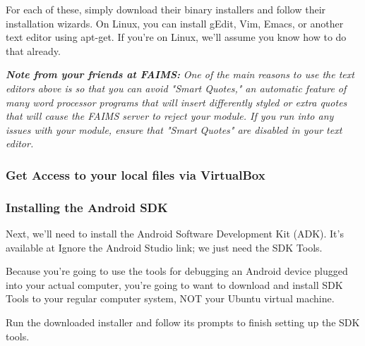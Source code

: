 For each of these, simply download their binary installers and follow their installation wizards. On Linux, you can install gEdit, Vim, Emacs, or another text editor using apt-get. If you're on Linux, we'll assume you know how to do that already.

{\em {\bf *Note from your friends at FAIMS:}} {\em One of the main reasons to use the text editors above is so that you can avoid "Smart Quotes," an automatic feature of many word processor programs that will insert differently styled or extra quotes that will cause the FAIMS server to reject your module. If you run into any issues with your module, ensure that "Smart Quotes" are disabled in your text editor.}

\subsubsection[section-4]{\crlf
}

\subsubsection[get-access-to-your-local-files-via-virtualbox]{Get Access to your local files via VirtualBox}

\subsubsection[installing-the-android-sdk]{Installing the Android SDK}

Next, we'll need to install the Android Software Development Kit (ADK). It's available at \from[url14] Ignore the Android Studio link; we just need the SDK Tools.

Because you're going to use the tools for debugging an Android device plugged into your actual computer, you're going to want to download and install SDK Tools to your regular computer system, NOT your Ubuntu virtual machine.

{}

{}

{}

Run the downloaded installer and follow its prompts to finish setting up the SDK tools.

